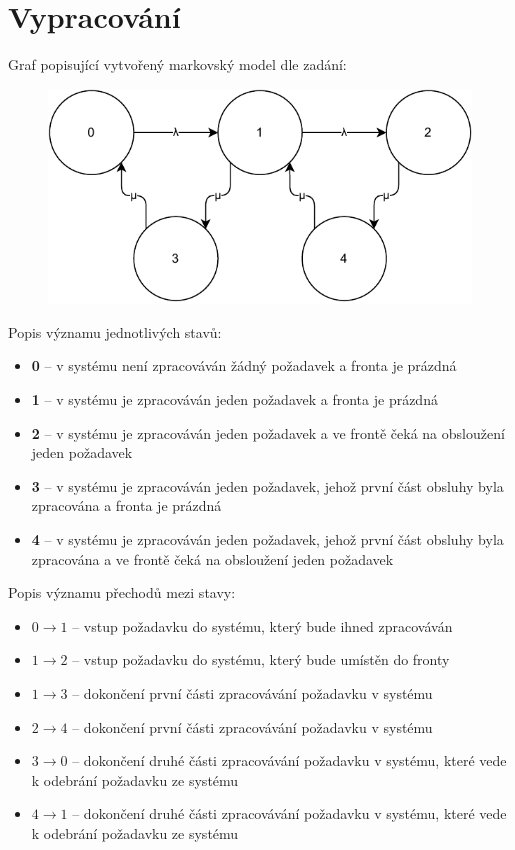 \documentclass[12pt, a4paper]{article}
\let\oldsection\section
\renewcommand\section{\clearpage\oldsection}
\begin{document}
\section{Vypracování}

Graf popisující vytvořený markovský model dle zadání:

\begin{figure}[!ht]
    \centering
    \includegraphics[width=.95\linewidth]{pdf/graph.pdf}
    \label{fig:test1}
\end{figure}

\noindent Popis významu jednotlivých stavů:
\begin{itemize}
    \item \textbf{0} -- v systému není zpracováván žádný požadavek a fronta je prázdná
    \item \textbf{1} -- v systému je zpracováván jeden požadavek a fronta je prázdná
    \item \textbf{2} -- v systému je zpracováván jeden požadavek a ve frontě čeká na obsloužení jeden požadavek
    \item \textbf{3} -- v systému je zpracováván jeden požadavek, jehož první část obsluhy byla zpracována a fronta je prázdná
    \item \textbf{4} -- v systému je zpracováván jeden požadavek, jehož první část obsluhy byla zpracována a ve frontě čeká na obsloužení jeden požadavek
\end{itemize}

\noindent Popis významu přechodů mezi stavy:
\begin{itemize}
    \item $0 \rightarrow 1$ -- vstup požadavku do systému, který bude ihned zpracováván
    \item $1 \rightarrow 2$ -- vstup požadavku do systému, který bude umístěn do fronty
    \item $1 \rightarrow 3$ -- dokončení první části zpracovávání požadavku v systému
    \item $2 \rightarrow 4$ -- dokončení první části zpracovávání požadavku v systému
    \item $3 \rightarrow 0$ -- dokončení druhé části zpracovávání požadavku v systému, které vede k odebrání požadavku ze systému
    \item $4 \rightarrow 1$ -- dokončení druhé části zpracovávání požadavku v systému, které vede k odebrání požadavku ze systému
\end{itemize}
\end{document}
